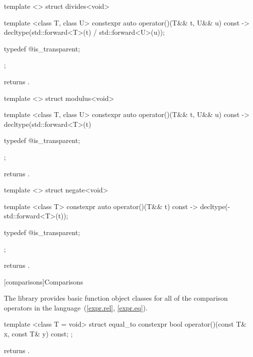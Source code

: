 %
\begin{itemdecl}
template <> struct divides<void> {
  template <class T, class U> constexpr auto operator()(T&& t, U&& u) const
    -> decltype(std::forward<T>(t) / std::forward<U>(u));

  typedef @\unspec@ is_transparent;
};
\end{itemdecl}

\begin{itemdescr}
\pnum
{} returns .
\end{itemdescr}

%
\begin{itemdecl}
template <> struct modulus<void> {
  template <class T, class U> constexpr auto operator()(T&& t, U&& u) const
    -> decltype(std::forward<T>(t) %

  typedef @\unspec@ is_transparent;
};
\end{itemdecl}

\begin{itemdescr}
\pnum
{} returns .
\end{itemdescr}

%
\begin{itemdecl}
template <> struct negate<void> {
  template <class T> constexpr auto operator()(T&& t) const
    -> decltype(-std::forward<T>(t));

  typedef @\unspec@ is_transparent;
};
\end{itemdecl}

\begin{itemdescr}
\pnum
{} returns .
\end{itemdescr}


[comparisons]{Comparisons}

\pnum
The library provides basic function object classes for all of the comparison
operators in the language~(\ref{expr.rel}, \ref{expr.eq}).

%
\begin{itemdecl}
template <class T = void> struct equal_to {
  constexpr bool operator()(const T& x, const T& y) const;
};
\end{itemdecl}

\begin{itemdescr}
\pnum
{} returns .
\end{itemdescr}

